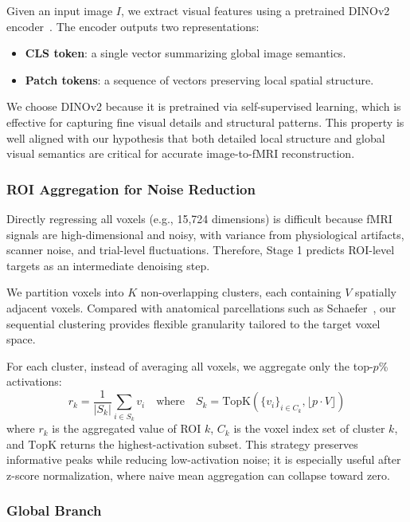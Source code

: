 Given an input image $I$, we extract visual features using a pretrained DINOv2 encoder~\cite{oquab2023dinov2}. The encoder outputs two representations:
\begin{itemize}
  \item \textbf{CLS token}: a single vector summarizing global image semantics.
  \item \textbf{Patch tokens}: a sequence of vectors preserving local spatial structure.
\end{itemize}
We choose DINOv2 because it is pretrained via self-supervised learning, which is effective for capturing fine visual details and structural patterns. This property is well aligned with our hypothesis that both detailed local structure and global visual semantics are critical for accurate image-to-fMRI reconstruction.

\subsubsection{ROI Aggregation for Noise Reduction}

Directly regressing all voxels (e.g., 15,724 dimensions) is difficult because fMRI signals are high-dimensional and noisy, with variance from physiological artifacts, scanner noise, and trial-level fluctuations. Therefore, Stage 1 predicts ROI-level targets as an intermediate denoising step.

We partition voxels into $K$ non-overlapping clusters, each containing $V$ spatially adjacent voxels. Compared with anatomical parcellations such as Schaefer~\cite{schaefer2018local}, our sequential clustering provides flexible granularity tailored to the target voxel space.

For each cluster, instead of averaging all voxels, we aggregate only the top-$p$\% activations:
\begin{equation}
  r_k = \frac{1}{|S_k|} \sum_{i \in S_k} v_i
  \quad \text{where} \quad S_k = \text{TopK}(\{v_i\}_{i \in C_k}, \lfloor p \cdot V \rfloor)
\end{equation}
where $r_k$ is the aggregated value of ROI $k$, $C_k$ is the voxel index set of cluster $k$, and $\text{TopK}$ returns the highest-activation subset. This strategy preserves informative peaks while reducing low-activation noise; it is especially useful after z-score normalization, where naive mean aggregation can collapse toward zero.

\subsubsection{Global Branch}

